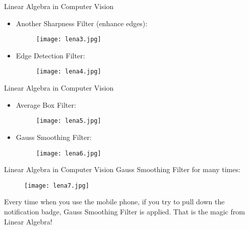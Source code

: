 \documentclass{beamer}
\begin{document}
\begin{frame}{Linear Algebra in Computer Vision}
    \begin{itemize}
        \item Another Sharpness Filter (enhance edges):
        \begin{figure}
            \centering
            \texttt{[image: lena3.jpg]}
        \end{figure}
        \item Edge Detection Filter:
        \begin{figure}
            \centering
            \texttt{[image: lena4.jpg]}
        \end{figure}
    \end{itemize}
\end{frame}

\begin{frame}{Linear Algebra in Computer Vision}
    \begin{itemize}
        \item Average Box Filter:
        \begin{figure}
            \centering
            \texttt{[image: lena5.jpg]}
        \end{figure}
        \item Gauss Smoothing Filter:
        \begin{figure}
            \centering
            \texttt{[image: lena6.jpg]}
        \end{figure}
    \end{itemize}
\end{frame}

\begin{frame}{Linear Algebra in Computer Vision}
Gauss Smoothing Filter for many times:
        \begin{figure}
            \centering
            \texttt{[image: lena7.jpg]}
        \end{figure}
        Every time when you use the mobile phone, if you try to pull down the notification badge, Gauss Smoothing Filter is applied. That is the magic from Linear Algebra!
\end{frame}
\end{document}
